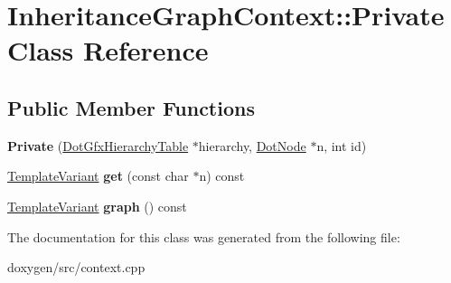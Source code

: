 \hypertarget{class_inheritance_graph_context_1_1_private}{}\section{Inheritance\+Graph\+Context\+::Private Class Reference}
\label{class_inheritance_graph_context_1_1_private}
\subsection*{Public Member Functions}
\begin{DoxyCompactItemize}
\item 
\mbox{\label{class_inheritance_graph_context_1_1_private_a0a8e5852e6a0f82e27ad74816961ab2f}} 
{\bfseries Private} (\mbox{\hyperlink{class_dot_gfx_hierarchy_table}{Dot\+Gfx\+Hierarchy\+Table}} $\ast$hierarchy, \mbox{\hyperlink{class_dot_node}{Dot\+Node}} $\ast$n, int id)
\item 
\mbox{\label{class_inheritance_graph_context_1_1_private_a625dc8de97e05d8d9ac896911353d2b0}} 
\mbox{\hyperlink{class_template_variant}{Template\+Variant}} {\bfseries get} (const char $\ast$n) const
\item 
\mbox{\label{class_inheritance_graph_context_1_1_private_aec3c3912c1ab08fe8de9e45c14c1eb71}} 
\mbox{\hyperlink{class_template_variant}{Template\+Variant}} {\bfseries graph} () const
\end{DoxyCompactItemize}


The documentation for this class was generated from the following file\+:\begin{DoxyCompactItemize}
\item 
doxygen/src/context.\+cpp\end{DoxyCompactItemize}
